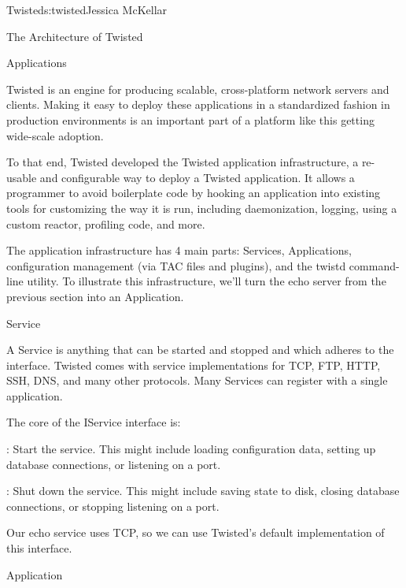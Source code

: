 \begin{aosachapter}{Twisted}{s:twisted}{Jessica McKellar}
\begin{aosasect1}{The Architecture of Twisted}
\begin{aosasect2}{Applications}

Twisted is an engine for producing scalable, cross-platform network servers
and clients. Making it easy to deploy these applications in a standardized
fashion in production environments is an important part of a platform like this
getting wide-scale adoption.

To that end, Twisted developed the Twisted application infrastructure, a
re-usable and configurable way to deploy a Twisted application. It allows a
programmer to avoid boilerplate code by hooking an application into existing
tools for customizing the way it is run, including daemonization, logging, using
a custom reactor, profiling code, and more.

The application infrastructure has 4 main parts: Services, Applications,
configuration management (via TAC files and plugins), and the twistd
command-line utility. To illustrate this infrastructure, we'll turn the echo
server from the previous section into an Application.

\begin{aosasect3}{Service}

A Service is anything that can be started and stopped and which adheres to
the  interface. Twisted comes with service implementations
for TCP, FTP, HTTP, SSH, DNS, and many other protocols. Many Services can
register with a single application.

The core of the IService interface is:

\begin{aosaitemize}

\item {}: Start the service. This might include
  loading configuration data, setting up database connections, or
  listening on a port.

\item {}: Shut down the service. This might include
  saving state to disk, closing database connections, or stopping
  listening on a port.

\end{aosaitemize}

Our echo service uses TCP, so we can use Twisted's default
 implementation of this 
interface.

\end{aosasect3}

\begin{aosasect3}{Application}


\end{aosasect3}
\end{aosasect2}
\end{aosasect1}
\end{aosachapter}
